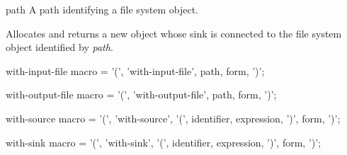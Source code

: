 \begin{optDefinition}
\begin{arguments}
    \item[path] A path identifying a file system object.
\end{arguments}
%
\result%
Allocates and returns a new  object whose sink is
connected to the file system object identified by {\em path}.

\Syntax
\savesyntax\withinputfileSyntax\vbox{\small\syntax
with-input-file macro
   = '(', 'with-input-file', path,  {form}, ')';
\endsyntax}

\Syntax
\savesyntax\withoutputfileSyntax\vbox{\small\syntax
with-output-file macro
   = '(', 'with-output-file', path,  {form}, ')';
\endsyntax}


\Syntax
\savesyntax\withoutputfileSyntax\vbox{\small\syntax
with-source macro
   = '(', 'with-source',
          '(', identifier, expression, ')', {form}, ')';
\endsyntax}

\Syntax
\savesyntax\withoutputfileSyntax\vbox{\small\syntax
with-sink macro
   = '(', 'with-sink',
          '(', identifier, expression, ')', {form}, ')';
\endsyntax}

\end{optDefinition}
%
